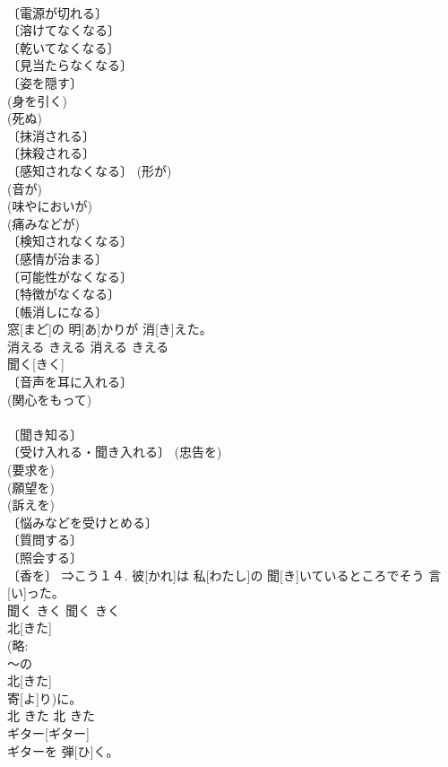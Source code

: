 \documentclass[8pt]{extreport}
\begin{document}
\begin{CJK}{UTF8}{min}
\\	〔電源が切れる〕 
\\	〔溶けてなくなる〕 
\\	〔乾いてなくなる〕 
\\	〔見当たらなくなる〕 
\\	〔姿を隠す〕 
\\	(身を引く) 
\\	(死ぬ) 
\\	〔抹消される〕 
\\	〔抹殺される〕 
\\	〔感知されなくなる〕 (形が) 
\\	(音が) 
\\	(味やにおいが) 
\\	(痛みなどが) 
\\	〔検知されなくなる〕 
\\	〔感情が治まる〕 
\\	〔可能性がなくなる〕 
\\	〔特徴がなくなる〕 
\\	〔帳消しになる〕 
\\	窓[まど]の 明[あ]かりが 消[き]えた。	
\\	消える	きえる	消える	きえる	
\\	聞く[きく]	
\\	〔音声を耳に入れる〕 
\\	(関心をもって) 
\\	[⇒きかせる２, きかない１] 
\\	〔聞き知る〕 
\\	〔受け入れる・聞き入れる〕 (忠告を) 
\\	(要求を) 
\\	(願望を) 
\\	(訴えを) 
\\	〔悩みなどを受けとめる〕 
\\	〔質問する〕 
\\	〔照会する〕 
\\	〔香を〕 ⇒こう１４.	彼[かれ]は 私[わたし]の 聞[き]いているところでそう 言[い]った。	
\\	聞く	きく	聞く	きく	
\\	北[きた]	
\\	(略: 
\\	～の 
\\	北[きた]
\\	寄[よ]り)に。	
\\	北	きた	北	きた	
\\	ギター[ギター]	
\\	ギターを 弾[ひ]く。	

\end{CJK}
\end{document}
